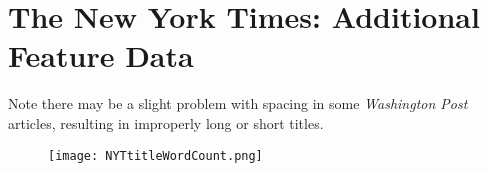 \documentclass [12 pt] {report}
\begin{document}
\section{The New York Times: Additional Feature Data}
Note there may be a slight problem with spacing in some \textit{Washington Post} articles, resulting in improperly long or short titles.
\begin{figure} [H]
	\centering
	\caption{New York Times Title Word Count}
	\begin{minipage}{.5\textwidth}
	\centering
	\texttt{[image: NYTtitleWordCount.png]}
	\label{NYT Title Word Count}
	\end{minipage}%
	\begin{minipage}{.5\textwidth}
	\begin{table}[H]
	\scriptsize
		\label{table: NYT Comparison: Title Word Count}
	\end{table}
	\end{minipage}
\end{figure}
\FloatBarrier
\end{document}
